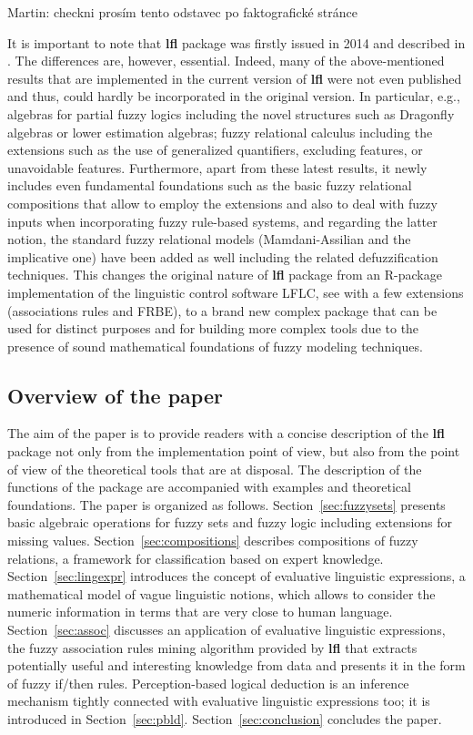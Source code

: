 \documentclass[review]{elsarticle}
\newcommand{\pkg}[1]{\textbf{#1}}
\newcommand{\Martin}[1]{{\color{blue} Martin: #1}}
\begin{document}
\Martin{checkni prosím tento odstavec po faktografické stránce}

It is important to note that {\bf lfl} package was firstly issued in {\color{red}2014} and described in \cite{Burda_lfl:FUZZ15}. The differences are, however, essential. Indeed, many of the above-mentioned results that are implemented in the current version of {\bf lfl} were not even published and thus, could hardly be incorporated in the original version. In particular, e.g., algebras for partial fuzzy logics including the novel structures such as Dragonfly algebras or lower estimation algebras; fuzzy relational calculus including the extensions such as the use of generalized quantifiers, excluding features, or unavoidable features. Furthermore, apart from these latest results, it newly includes even fundamental foundations such as the basic  fuzzy relational compositions that allow to employ the extensions and also to deal with fuzzy inputs when incorporating fuzzy rule-based systems, and regarding the latter notion, the standard fuzzy relational models (Mamdani-Assilian and the implicative one) have been added as well including the related defuzzification techniques. This changes the original nature of {\bf lfl} package from an R-package implementation of the linguistic control software LFLC, see \cite{dvo:lflc} with a few extensions (associations rules and FRBE), to a brand new complex package that can be used for distinct purposes and for building more complex tools due to the presence of sound mathematical foundations of fuzzy modeling techniques. 


\subsection{Overview of the paper}

The aim of the paper is to provide readers with a concise description of the \pkg{lfl} package not only from the implementation point of view, but also from the point of view of the theoretical tools that are at disposal. The description of the functions of the package are accompanied with examples and theoretical foundations. The paper is organized as follows. Section~\ref{sec:fuzzysets} presents basic algebraic operations for fuzzy sets and fuzzy logic including extensions for missing values. Section~\ref{sec:compositions} describes compositions of fuzzy relations, a framework for classification based on expert knowledge. Section~\ref{sec:lingexpr} introduces the concept of evaluative linguistic expressions, a mathematical model of vague linguistic notions, which allows to consider the numeric information in terms that are very close to human language. Section~\ref{sec:assoc} discusses an application of evaluative linguistic expressions, the fuzzy association rules mining algorithm provided by \pkg{lfl} that extracts potentially useful and interesting knowledge from data and presents it in the form of fuzzy if/then rules. Perception-based logical deduction is an inference mechanism tightly connected with evaluative linguistic expressions too; it is introduced in Section~\ref{sec:pbld}. Section~\ref{sec:conclusion} concludes the paper.
\end{document}
